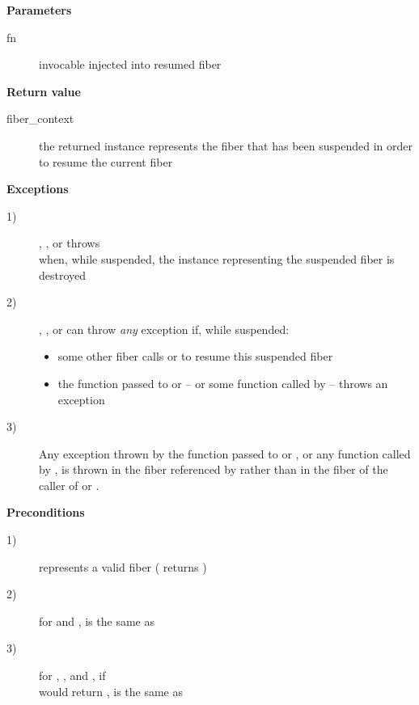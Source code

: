 {\bfseries Parameters}
\begin{description}
    \item[fn] invocable injected into resumed fiber\\
\end{description}

{\bfseries Return value}
\begin{description}
    \item[fiber\_context] the returned instance represents the fiber that has been
                 suspended in order to resume the current fiber
\end{description}

{\bfseries Exceptions}
\begin{description}
    \item[1)] \resume, \resumewith, \xtresume or \xtresumewith throws\\
              \unwindex when, while suspended, the \fiber instance representing
              the suspended fiber is destroyed
    \item[2)] \resume, \resumewith, \xtresume or \xtresumewith can
              throw \emph{any} exception if, while suspended:
              \begin{itemize}
                  \item some other fiber calls \resumewith or \xtresumewith to
                        resume this suspended fiber
                  \item the function  passed to \resumewith
                        or \xtresumewith -- or some function called
                        by  -- throws an exception
              \end{itemize}
    \item[3)] Any exception thrown by the function  passed
              to \resumewith or \xtresumewith, or any function called
              by , is thrown in the fiber referenced by 
              rather than in the fiber of the caller of \resumewith
              or \xtresumewith.
\end{description}

{\bfseries Preconditions}
\begin{description}
    \item[1)]  represents a valid fiber ( returns )
    \item[2)] for \resume and \resumewith, \currthread is the same as
              \lastthread
    \item[3)] for \resume, \resumewith, \xtresume and \xtresumewith, if\\
              \canxtresume would return , \currthread is
              the same as \lastthread
\end{description}

